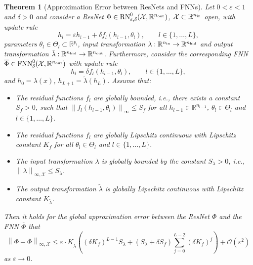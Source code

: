 \documentclass[10pt]{article}
\newtheorem{theorem}{Theorem}[section]
\theoremstyle{definition}
\numberwithin{equation}{section}
\newcommand{\eps}{\varepsilon}
\newcommand\norm[1]{\left\lVert#1\right\rVert}
\newcommand{\R}{\mathbb{R}}
\newcommand*{\nout}{n_\textup{out}}
\newcommand*{\nhid}{n_\textup{hid}}
\newcommand*{\nin}{n_\textup{in}}
\begin{document}
\begin{theorem}[Approximation Error between ResNets and FNNs] \label{th:mlp_resnet_error}   
	Let $0<\eps<1$ and $\delta>0$ and consider a ResNet $\Phi \in \textup{RN}^0_{\eps,\delta}(\mathcal{X},\R^{\nout})$, $\mathcal{X}\subset \R^{\nin}$ open, with update rule
	\begin{equation*}
		h_l = \eps h_{l-1} + \delta f_l(h_{l-1},\theta_l), \qquad l \in \{1,\ldots,L\},
	\end{equation*}
    parameters $\theta_l\in \Theta_l \subset \R^{p_l}$, input transformation $\lambda:\R^{\nin} \rightarrow \R^{\nhid}$ and output transformation $\tilde{\lambda}: \R^{\nhid} \rightarrow \R^{\nout}$.
	Furthermore, consider the corresponding FNN $\overline{\Phi} \in \textup{FNN}^0_{\delta}(\mathcal{X},\R^{\nout})$ with update rule
	\begin{equation*}
		h_l = \delta f_l(h_{l-1},\theta_l), \qquad l \in \{1,\ldots,L\},
	\end{equation*}
	and $h_0 = \lambda(x)$, $h_{L+1} = \tilde{\lambda}(h_L)$. Assume that:
	\begin{itemize}
		\item The residual functions $f_l$ are globally bounded, i.e., there exists a constant $S_f>0$, such that $\norm{f_l(h_{l-1},\theta_l)}_\infty \leq S_f$ for all $h_{l-1} \in \R^{n_{l-1}}$, $\theta_l \in \Theta_l$ and $l \in \{1,\ldots,L\}$. 
        \item The residual functions $f_l$ are globally Lipschitz continuous with Lipschitz constant $K_f$ for all $\theta_l\in\Theta_l$ and $l \in \{1,\ldots,L\}$.  
        \item The input transformation $\lambda$ is globally bounded by the constant $S_\lambda>0$, i.e., $\norm{\lambda}_{\infty,\mathcal{X}}\leq S_\lambda$.
        \item The output transformation $\tilde{\lambda}$ is globally Lipschitz continuous with Lipschitz constant $K_{\tilde{\lambda}}$.
	\end{itemize}
	Then it holds for the global approximation error between the ResNet $\Phi$ and the FNN $\overline{\Phi}$ that
    \begin{equation}\label{eq:error_resnet_mlp}
	   \norm{\Phi-\overline{\Phi}}_{\infty,\mathcal{X}} \leq \eps \cdot K_{\tilde{\lambda}} \left(  (\delta K_f)^{L-1} S_\lambda + (S_\lambda +\delta S_f)  \sum_{j = 0}^{L-2} (\delta K_f)^j\right)  + \mathcal{O}(\eps^2)
    \end{equation}
    as $\eps \rightarrow 0$.
\end{theorem}
\end{document}
